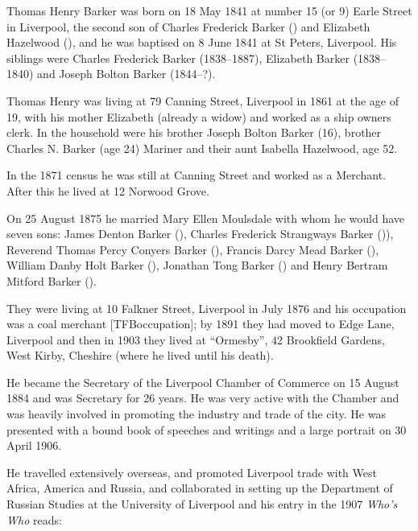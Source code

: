 
Thomas Henry Barker was born on 18 May 1841\cite{THBbirth} at number 15 (or 9\cite{THBbirth}) Earle Street in Liverpool,\cite{THBplantagenets} the second son of Charles Frederick Barker () and Elizabeth Hazelwood (), and he was baptised on 8 June 1841 at St Peters, Liverpool.\cite{THBbaptism} His siblings were Charles Frederick Barker (1838--1887),  Elizabeth Barker (1838--1840) and Joseph Bolton Barker (1844--?).

Thomas Henry was living at 79 Canning Street, Liverpool in 1861 at the age of 19, with his mother Elizabeth (already a widow) and worked as a ship owners clerk.  In the household were his brother Joseph Bolton Barker (16), brother Charles N. Barker (age 24) Mariner and their aunt Isabella Hazelwood, age 52.

In the 1871 census he was still at Canning Street and worked as a Merchant. After this he lived at 12 Norwood Grove\cite{THBcensus}.

On 25 August 1875 he married Mary Ellen Moulsdale\cite{THBmarriage} with whom he would have seven sons:\cite{THBplantagenets}  James Denton Barker (), Charles Frederick Strangways Barker ()), Reverend Thomas Percy Conyers Barker (), Francis Darcy Mead Barker (), William Danby Holt Barker (), 
Jonathan Tong Barker () and Henry Bertram Mitford Barker ().
 
They were living at 10 Falkner Street, Liverpool in July 1876 and his occupation was a coal merchant [TFBoccupation];  by 1891 they had moved to Edge Lane, Liverpool\cite{THBresidence} and then in 1903 they lived at ``Ormesby'', 42 Brookfield Gardens, West Kirby, Cheshire (where he lived until his death).\cite{THBdeathcert}

He became the Secretary of the Liverpool Chamber of Commerce on 15 August 1884 and was Secretary for 26 years.  He was very active with the Chamber and was heavily involved in promoting the industry and trade of the city.  He was presented with a bound book of speeches and writings and a large portrait on 30 April 1906.

He travelled extensively overseas, and promoted Liverpool trade with West Africa, America and Russia, and collaborated in setting up the Department of Russian Studies at the University of Liverpool and his entry in  the 1907 \emph{Who's Who} reads:

